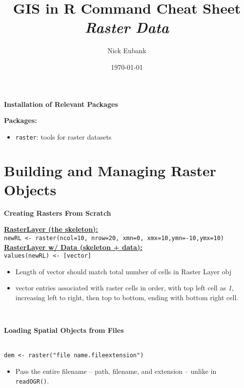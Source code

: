 \documentclass[10pt]{article}
\title{GIS in R Command Cheat Sheet \\ \emph{Raster Data}}
\date{\today}
\author{Nick Eubank}
\begin{document}
 
\maketitle

	
\centerline{\textbf{Installation of Relevant Packages}}
\textbf{Packages:}
\begin{itemize}
	\item \texttt{raster}: tools for raster datasets
\end{itemize}

\section*{Building and Managing Raster Objects}


\centerline{\textbf{Creating Rasters From Scratch}} 

\underline{\textbf{RasterLayer (the skeleton):}}\\
\hspace*{0.3cm}\texttt{newRL <- raster(ncol=10, nrow=20, xmn=0, xmx=10,ymn=-10,ymx=10)}\\
\underline{\textbf{RasterLayer w/ Data (skeleton + data):}}\\
\hspace*{0.3cm}\texttt{values(newRL) <- [vector]}
\begin{itemize}
	\item Length of vector should match total number of cells in Raster Layer obj
	\item vector entries associated with raster cells in order, with top left cell as \emph{1}, increasing left to right, then top to bottom, ending with bottom right cell. 
\end{itemize}



\hrulefill \\ 
\centerline{\textbf{Loading Spatial Objects from Files}} \\
\texttt{dem <- raster("file name.fileextension")}
\begin{itemize}
	\item Pass the entire filename  -- path, filename, and extension -- unlike in \texttt{readOGR()}.
\end{itemize}
\end{document}
